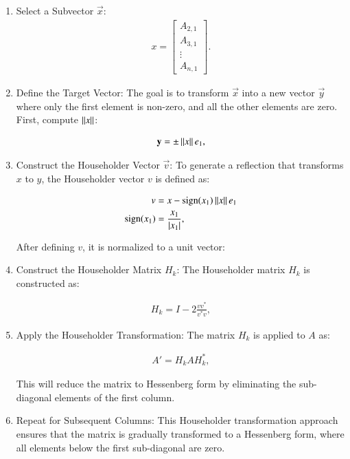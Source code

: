 \documentclass[journal, article]{IEEEtran}
\begin{document}
\begin{enumerate}
	\item Select a Subvector $\vec{x}$:
\begin{align}
	x = \begin{bmatrix}
		A_{2,1} \\
		A_{3,1} \\
		\vdots \\
		A_{n,1}
	\end{bmatrix}.
\end{align}

\item Define the Target Vector:
	The goal is to transform $\vec{x}$ into a new vector $\vec{y}$ where only the first element is non-zero, and all the other elements are zero. First, compute $\left\lVert x\right\rVert$:

		\begin{align}
			\mathbf{y} = \pm \left\lVert x\right\rVert e_1,
		\end{align}

\item Construct the Householder Vector $\vec{v}$:
	To generate a reflection that transforms \( x \) to \( y \), the Householder vector \( v \) is defined as:

		\begin{align}
			v &= x - \text{sign}(x_1) \left\lVert x\right\rVert e_1\\
			\text{sign}(x_1) &= \frac{x_1}{|x_1|},
		\end{align}

	After defining \( v \), it is normalized to a unit vector:

\item Construct the Householder Matrix \( H_k \):
	The Householder matrix \( H_k \) is constructed as:

		\begin{align}
		H_k = I - 2 \frac{v v^*}{v^* v},
		\end{align}

\item Apply the Householder Transformation:
	The matrix \( H_k \) is applied to \( A \) as:

		\begin{align}
		A' = H_k A H_k^*,
		\end{align}

	This will reduce the matrix to Hessenberg form by eliminating the sub-diagonal elements of the first column.

\item Repeat for Subsequent Columns:
	This Householder transformation approach ensures that the matrix is gradually transformed to a Hessenberg form, where all elements below the first sub-diagonal are zero.
\end{enumerate}
\end{document}

